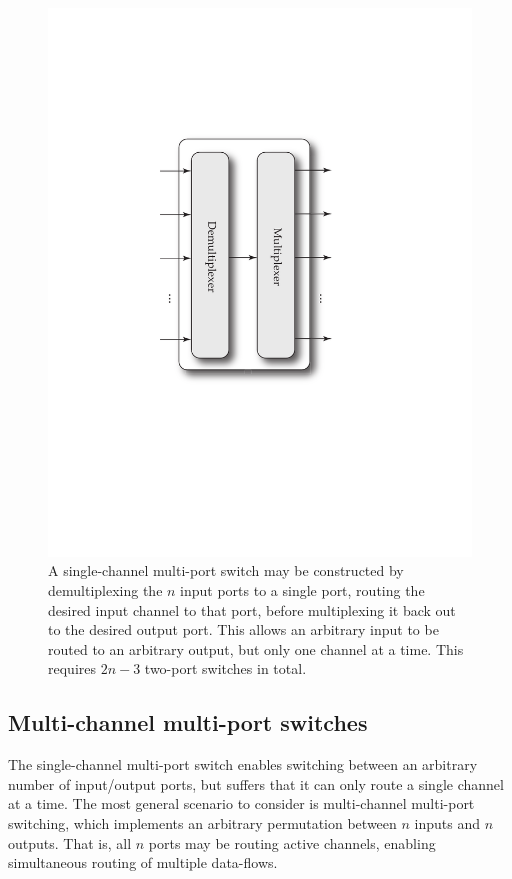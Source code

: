 \documentclass[aps,rmp,twocolumn,amsmath,amssymb,nofootinbib,superscriptaddress,longbibliography,floatfix,table-of-contents,eqsecnum]{revtex4-1}
\begin{document}
\begin{figure}[!htb]
\includegraphics[width=0.75\columnwidth]{single_channel_multi_port_switch}
\caption{A single-channel multi-port switch may be constructed by demultiplexing the $n$ input ports to a single port, routing the desired input channel to that port, before multiplexing it back out to the desired output port. This allows an arbitrary input to be routed to an arbitrary output, but only one channel at a time. This requires \mbox{$2n-3$} two-port switches in total.} \label{fig:single_channel_multi_port_switch} 	
\end{figure}

%
%

\subsection{Multi-channel multi-port switches} 

The single-channel multi-port switch enables switching between an arbitrary number of input/output ports, but suffers that it can only route a single channel at a time. The most general scenario to consider is multi-channel multi-port switching, which implements an arbitrary permutation between $n$ inputs and $n$ outputs. That is, all $n$ ports may be routing active channels, enabling simultaneous routing of multiple data-flows.
\end{document}
